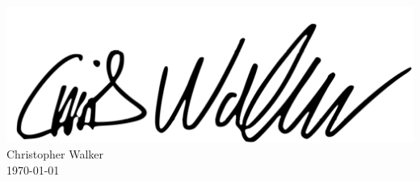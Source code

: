 \begin{titlepage}
\begin{flushleft}
    \includegraphics[scale=0.7]{lib/signature.png} \\

    Christopher Walker \\ \today
    \end{flushleft}

    \end{titlepage}
